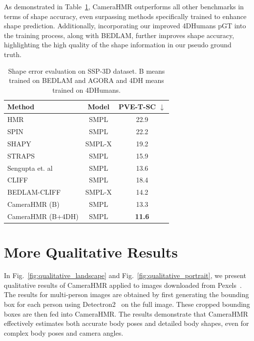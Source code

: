 As demonstrated in Table~\ref{ssp-eval}, CameraHMR outperforms all other benchmarks in terms of shape accuracy, even surpassing methods specifically trained to enhance shape prediction. Additionally, incorporating our improved 4DHumans pGT into the training process, along with BEDLAM, further improves shape accuracy, highlighting the high quality of the shape information in our pseudo ground truth.
\begin{table}
\centering
{\scriptsize
  \begin{tabular}{l|c|c}
    \toprule
     Method & Model & PVE-T-SC $\downarrow$\\
    \midrule
    HMR~\cite{Kanazawa2018_hmr} & SMPL & 22.9\\
    SPIN~\cite{spin} & SMPL & 22.2 \\
    SHAPY~\cite{shapy} & SMPL-X & 19.2\\
    STRAPS~\cite{ssp} & SMPL & 15.9\\
    Sengupta et. al~\cite{sengupta} & SMPL & 13.6\\
    CLIFF~\cite{li2022cliff} & SMPL & 18.4\\
    BEDLAM-CLIFF~\cite{bedlam} & SMPL-X & 14.2\\
    CameraHMR (B) & SMPL & 13.3\\
    CameraHMR (B+4DH)& SMPL & \textbf{11.6}\\
    
    \bottomrule
  \end{tabular}
  }
  \caption{Shape error evaluation on SSP-3D dataset. B means trained on BEDLAM and AGORA and 4DH means trained on 4DHumans.}
  
\label{ssp-eval}

\end{table}

\section{More Qualitative Results}
In Fig.~\ref{fig:qualitative_landscape} and Fig.~\ref{fig:qualitative_portrait}, we present qualitative results of CameraHMR applied to images downloaded from Pexels~\cite{pexel}. The results for multi-person images are obtained by first generating the bounding box for each person using Detectron2~\cite{detectron2} on the full image. These cropped bounding boxes are then fed into CameraHMR. The results demonstrate that CameraHMR effectively estimates both accurate body poses and detailed body shapes, even for complex body poses and camera angles.

